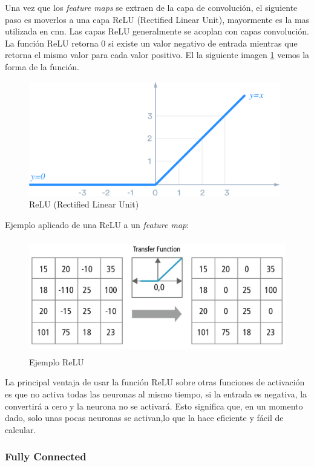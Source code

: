 Una vez que los \textit{feature maps} se extraen de la capa de convolución, el siguiente paso es moverlos a una capa ReLU (Rectified Linear Unit), mayormente es la mas utilizada en \ac{cnn}. Las capas ReLU generalmente se acoplan con capas convolución. La función ReLU retorna 0 si existe un valor negativo de entrada mientras que retorna el mismo valor para cada valor positivo. El la siguiente imagen \ref{Fig:relu} vemos la forma de la función.

\begin{figure}[H]
 \centering
  \includegraphics[height=5cm,keepaspectratio=true,clip=true]{imagenes/MarcoTeorico/ReLU_1.png}
  \caption{ReLU (Rectified Linear Unit)} \label{Fig:relu}
\end{figure}

Ejemplo aplicado de una ReLU a un \textit{feature map}:
\begin{figure}[H]
 \centering
  \includegraphics[height=5cm,keepaspectratio=true,clip=true]{imagenes/MarcoTeorico/ReLU_2.jpeg}
  \caption{Ejemplo ReLU } \label{Fig:relu2}
\end{figure}

La principal ventaja de usar la función ReLU sobre otras funciones de activación es que no activa todas las neuronas al mismo tiempo, si la entrada es negativa, la convertirá a cero y la neurona no se activará. Esto significa que, en un momento dado, solo unas pocas neuronas se activan,lo que la hace eficiente y fácil de calcular.


\subsubsection{Fully Connected}\label{sub:fully_connected}

